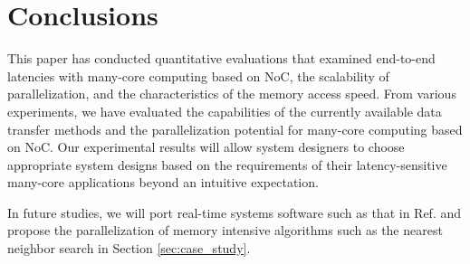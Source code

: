 \documentclass[conference,compsoc]{IEEEtran}
\begin{document}
\section{Conclusions}
\label{sec:conclusion}
This paper has conducted quantitative evaluations that examined end-to-end latencies with many-core computing based on NoC, the scalability of parallelization, and the characteristics of the memory access speed.
From various experiments, we have evaluated the capabilities of the currently available data transfer methods and the parallelization potential for many-core computing based on NoC.
Our experimental results will allow system designers to choose appropriate system designs based on the requirements of their latency-sensitive many-core applications beyond an intuitive expectation.

In future studies, we will port real-time systems software such as that in Ref. \cite{maruyama2016ros2} and propose the parallelization of memory intensive algorithms such as the nearest neighbor search in Section \ref{sec:case_study}.

% 
% 


\end{document}

